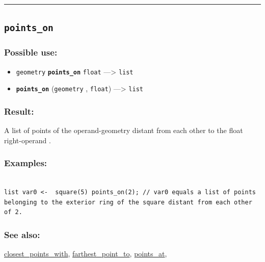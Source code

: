 \documentclass[]{book}
\providecommand{\tightlist}{%
  \setlength{\itemsep}{0pt}\setlength{\parskip}{0pt}}
\theoremstyle{definition}
\theoremstyle{definition}
\theoremstyle{definition}
\theoremstyle{remark}
\begin{document}
\begin{center}\rule{0.5\linewidth}{\linethickness}\end{center}

\subsection{\texorpdfstring{\texttt{points\_on}}{points\_on}}\label{points_on}

\subsubsection{Possible use:}\label{possible-use-411}

\begin{itemize}
\tightlist
\item
  \texttt{geometry} \textbf{\texttt{points\_on}} \texttt{float}
  ---\textgreater{} \texttt{list}
\item
  \textbf{\texttt{points\_on}} (\texttt{geometry} , \texttt{float})
  ---\textgreater{} \texttt{list}
\end{itemize}

\subsubsection{Result:}\label{result-397}

A list of points of the operand-geometry distant from each other to the
float right-operand .

\subsubsection{Examples:}\label{examples-285}

\begin{verbatim}
 
list var0 <-  square(5) points_on(2); // var0 equals a list of points belonging to the exterior ring of the square distant from each other of 2.
\end{verbatim}

\subsubsection{See also:}\label{see-also-164}

\href{operators-b-to-c.html\#closest_points_with}{closest\_points\_with},
\href{operators-d-to-h.html\#farthest_point_to}{farthest\_point\_to},
\href{operators-n-to-r.html\#points_at}{points\_at},
\end{document}
